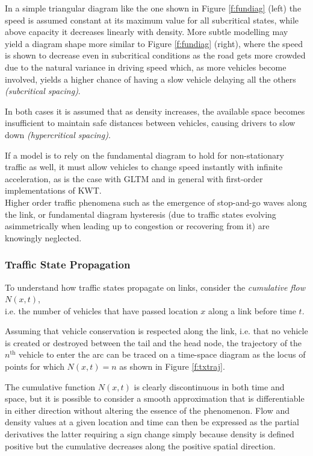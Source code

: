 In a simple triangular diagram like the one shown in Figure \ref{f:fundiag} (left) the speed is assumed constant at its maximum value for all subcritical states, while above capacity it decreases linearly with density. More subtle modelling may yield a diagram shape more similar to Figure \ref{f:fundiag} (right), where the speed is shown to decrease even in subcritical conditions as the road gets more crowded due to the natural variance in driving speed which, as more vehicles become involved, yields a higher chance of having a slow vehicle delaying all the others \emph{(subcritical spacing)}.

 In both cases it is assumed that as density increases, the available space becomes insufficient to maintain safe distances between vehicles, causing drivers to slow down \emph{(hypercritical spacing)}.

If a model is to rely on the fundamental diagram to hold for non-stationary traffic as well, it must allow vehicles to change speed instantly with infinite acceleration, as is the case with GLTM and in general with first-order implementations of KWT. \\
Higher order traffic phenomena such as the emergence of stop-and-go waves along the link, or fundamental diagram hysteresis (due to traffic states evolving asimmetrically when leading up to congestion or recovering from it) are knowingly neglected.

\subsubsection{Traffic State Propagation}
To understand how traffic states propagate on links, consider the \emph{cumulative flow} $N(x,t)$, \\ i.e. the number of vehicles that have passed location $x$ along a link before time $t$.

Assuming that vehicle conservation is respected along the link, i.e. that no vehicle is created or destroyed between the tail and the head node, the trajectory of the $n^{\mathrm{th}}$ vehicle to enter the arc can be traced on a time-space diagram as the locus of points for which $N(x,t) = n$ as shown in Figure \ref{f:txtraj}.


The cumulative function $N(x,t)$ is clearly discontinuous in both time and space, but it is possible to consider a smooth approximation that is differentiable in either direction without altering the essence of the phenomenon. Flow and density values at a given location and time can then be expressed as the partial derivatives
the latter requiring a sign change simply because density is defined positive but the cumulative decreases along the positive spatial direction.


